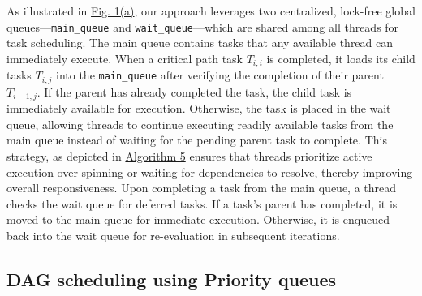 As illustrated in \hyperref[fig:flowchart]{Fig. 1(a)}, our approach leverages two centralized, lock-free global queues—\texttt{main\_queue} and \texttt{wait\_queue}—which are shared among all threads for task scheduling. The main queue contains tasks that any available thread can immediately execute. When a critical path task \(T_{i,i}\) is completed, it loads its child tasks \(T_{i,j}\) into the \texttt{main\_queue} after verifying the completion of their parent \(T_{i-1,j}\). If the parent has already completed the task, the child task is immediately available for execution. Otherwise, the task is placed in the wait queue, allowing threads to continue executing readily available tasks from the main queue instead of waiting for the pending parent task to complete. This strategy, as depicted in \hyperref[alg:thdwork]{Algorithm 5} ensures that threads prioritize active execution over spinning or waiting for dependencies to resolve, thereby improving overall responsiveness. Upon completing a task from the main queue, a thread checks the wait queue for deferred tasks. If a task’s parent has completed, it is moved to the main queue for immediate execution. Otherwise, it is enqueued back into the wait queue for re-evaluation in subsequent iterations.

\subsection{DAG scheduling using Priority queues}

